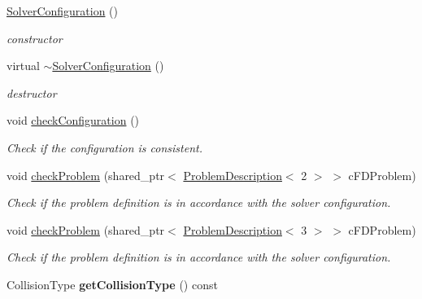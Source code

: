 \begin{DoxyCompactItemize}
\item 
\hypertarget{classnatrium_1_1SolverConfiguration_a9aa7109e2eac9b8a7b424a35509ccdb0}{\hyperlink{classnatrium_1_1SolverConfiguration_a9aa7109e2eac9b8a7b424a35509ccdb0}{Solver\-Configuration} ()}\label{classnatrium_1_1SolverConfiguration_a9aa7109e2eac9b8a7b424a35509ccdb0}

\begin{DoxyCompactList}\small\item\em constructor \end{DoxyCompactList}\item 
\hypertarget{classnatrium_1_1SolverConfiguration_ac1b521d8c205b8774dbb7c038304336d}{virtual \hyperlink{classnatrium_1_1SolverConfiguration_ac1b521d8c205b8774dbb7c038304336d}{$\sim$\-Solver\-Configuration} ()}\label{classnatrium_1_1SolverConfiguration_ac1b521d8c205b8774dbb7c038304336d}

\begin{DoxyCompactList}\small\item\em destructor \end{DoxyCompactList}\item 
void \hyperlink{classnatrium_1_1SolverConfiguration_a06547d0908d22a6f4f0bde286ba0c4fc}{check\-Configuration} ()
\begin{DoxyCompactList}\small\item\em Check if the configuration is consistent. \end{DoxyCompactList}\item 
void \hyperlink{classnatrium_1_1SolverConfiguration_a49e6c9cd57689289c79b47a6104b483a}{check\-Problem} (shared\-\_\-ptr$<$ \hyperlink{classnatrium_1_1ProblemDescription}{Problem\-Description}$<$ 2 $>$ $>$ c\-F\-D\-Problem)
\begin{DoxyCompactList}\small\item\em Check if the problem definition is in accordance with the solver configuration. \end{DoxyCompactList}\item 
void \hyperlink{classnatrium_1_1SolverConfiguration_af13da3022a9f995ce09b0918092da0c9}{check\-Problem} (shared\-\_\-ptr$<$ \hyperlink{classnatrium_1_1ProblemDescription}{Problem\-Description}$<$ 3 $>$ $>$ c\-F\-D\-Problem)
\begin{DoxyCompactList}\small\item\em Check if the problem definition is in accordance with the solver configuration. \end{DoxyCompactList}\item 
\hypertarget{classnatrium_1_1SolverConfiguration_a80b7bb1348a80859262bcd6c2bd9a92b}{Collision\-Type {\bfseries get\-Collision\-Type} () const }\label{classnatrium_1_1SolverConfiguration_a80b7bb1348a80859262bcd6c2bd9a92b}


\end{DoxyCompactItemize}
